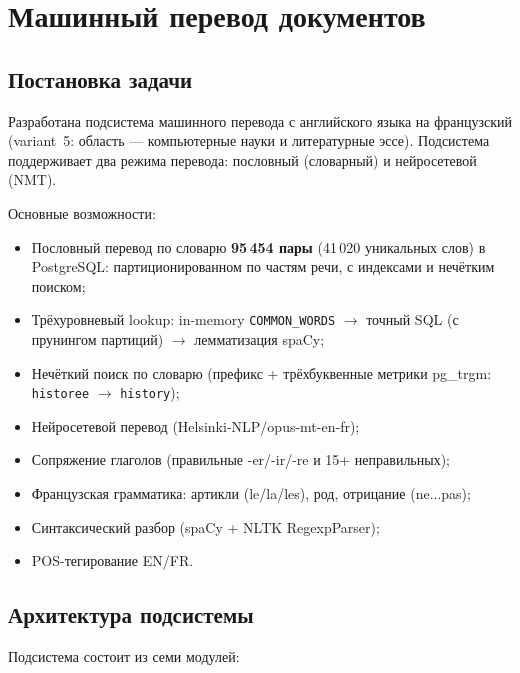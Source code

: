 \section{Машинный перевод документов}
\label{sec:translate}

\subsection{Постановка задачи}

Разработана подсистема машинного перевода с английского языка на французский
(variant~5: область --- компьютерные науки и литературные эссе).
Подсистема поддерживает два режима перевода:
пословный (словарный) и нейросетевой (NMT).

Основные возможности:
\begin{itemize}
	\item Пословный перевод по словарю \textbf{95\,454 пары}
	      (41\,020 уникальных слов) в PostgreSQL: партиционированном по
	      частям речи, с индексами и нечётким поиском;
	\item Трёхуровневый lookup: in-memory \texttt{COMMON\_WORDS} $\to$
	      точный SQL (с прунингом партиций) $\to$ лемматизация spaCy;
	\item Нечёткий поиск по словарю (префикс + трёхбуквенные метрики pg\_trgm:
	      \texttt{historee} $\to$ \texttt{history});
	\item Нейросетевой перевод (Helsinki-NLP/opus-mt-en-fr);
	\item Сопряжение глаголов (правильные -er/-ir/-re и 15+ неправильных);
	\item Французская грамматика: артикли (le/la/les), род, отрицание (ne...pas);
	\item Синтаксический разбор (spaCy + NLTK RegexpParser);
	\item POS-тегирование EN/FR.
\end{itemize}

\subsection{Архитектура подсистемы}

Подсистема состоит из семи модулей:

